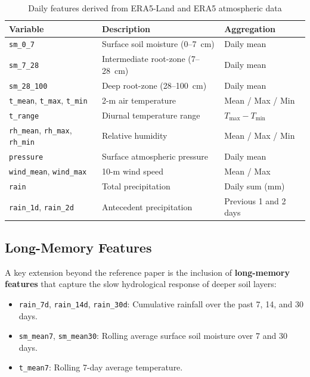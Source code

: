 \documentclass[12pt, a4paper]{article}
\begin{document}
\begin{table}[H]
\centering
\caption{Daily features derived from ERA5-Land and ERA5 atmospheric data}
\label{tab:features}
\begin{tabular}{lll}
\toprule
\textbf{Variable} & \textbf{Description} & \textbf{Aggregation} \\
\midrule
\texttt{sm\_0\_7} & Surface soil moisture (0--7~cm) & Daily mean \\
\texttt{sm\_7\_28} & Intermediate root-zone (7--28~cm) & Daily mean \\
\texttt{sm\_28\_100} & Deep root-zone (28--100~cm) & Daily mean \\
\texttt{t\_mean}, \texttt{t\_max}, \texttt{t\_min} & 2-m air temperature & Mean / Max / Min \\
\texttt{t\_range} & Diurnal temperature range & $T_{\max} - T_{\min}$ \\
\texttt{rh\_mean}, \texttt{rh\_max}, \texttt{rh\_min} & Relative humidity & Mean / Max / Min \\
\texttt{pressure} & Surface atmospheric pressure & Daily mean \\
\texttt{wind\_mean}, \texttt{wind\_max} & 10-m wind speed & Mean / Max \\
\texttt{rain} & Total precipitation & Daily sum (mm) \\
\texttt{rain\_1d}, \texttt{rain\_2d} & Antecedent precipitation & Previous 1 and 2 days \\
\bottomrule
\end{tabular}
\end{table}

\subsection{Long-Memory Features}

A key extension beyond the reference paper is the inclusion of \textbf{long-memory features} that capture the slow hydrological response of deeper soil layers:

\begin{itemize}
    \item \texttt{rain\_7d}, \texttt{rain\_14d}, \texttt{rain\_30d}: Cumulative rainfall over the past 7, 14, and 30 days.
    \item \texttt{sm\_mean7}, \texttt{sm\_mean30}: Rolling average surface soil moisture over 7 and 30 days.
    \item \texttt{t\_mean7}: Rolling 7-day average temperature.
\end{itemize}
\end{document}
